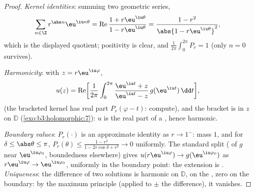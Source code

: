 \begin{proof}
\emph{Kernel identities}: summing two geometric series,
\[
\sum_{n\in\Z}r^{\abs n}\eu^{\iu n\theta}
= \operatorname{Re}\frac{1 + r\eu^{\iu\theta}}{1 -
r\eu^{\iu\theta}}
= \frac{1 - r^2}{\abs{1 - r\eu^{\iu\theta}}^2},
\]
which is the displayed quotient; positivity is clear, and
$\frac1{2\pi}\int_0^{2\pi}P_r = 1$ (only $n = 0$ survives).

\emph{Harmonicity}: with $z = r\eu^{\iu\varphi}$,
\[
u(z) = \operatorname{Re}\biggl[\frac1{2\pi}\int_0^{2\pi}
\frac{\eu^{\iu t} + z}{\eu^{\iu t} - z}\,
g(\eu^{\iu t})\,\dd t\biggr],
\]
(the bracketed kernel has real part $P_r(\varphi - t)$:
compute), and the bracket is  in $z$ on $\mathbb D$
(\cref{exo:b3:holomorphic:7}): $u$ is the real part of a
, hence harmonic.

\emph{Boundary values}: $P_r(\cdot)$ is an approximate
identity as $r \to 1^-$: mass $1$, and for $\delta \leq
\abs\theta \leq \pi$, $P_r(\theta) \leq \frac{1 - r^2}{1 -
2r\cos\delta + r^2} \to 0$ uniformly. The standard split
( of $g$ near $\eu^{\iu\varphi_0}$, boundedness
elsewhere) gives $u(r\eu^{\iu\varphi}) \to
g(\eu^{\iu\varphi_0})$ as $r\eu^{\iu\varphi} \to
\eu^{\iu\varphi_0}$, uniformly in the boundary point: the
extension is . \emph{Uniqueness}: the difference of
two solutions is harmonic on $\mathbb D$,  on the
, zero on the boundary: by the maximum principle
(applied to $\pm$ the difference), it vanishes.
\end{proof}

